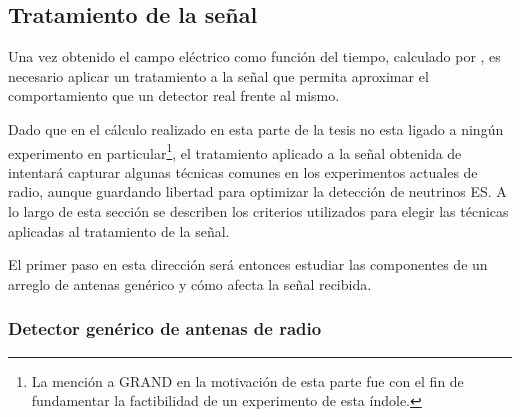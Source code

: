 	\subsection{Tratamiento de la se\~nal}
	\label{sbsc:sig_treat}
	
	Una vez obtenido el campo el\'ectrico como funci\'on del tiempo, calculado por \zhs{}, es necesario aplicar un tratamiento a la se\~nal que permita aproximar el comportamiento que un detector real frente al mismo.
	
	Dado que en el c\'alculo realizado en esta parte de la tesis no esta ligado a ning\'un experimento en particular\footnote{La menci\'on a GRAND en la motivaci\'on de esta parte fue con el fin de fundamentar la factibilidad de un experimento de esta \'indole.}, el tratamiento aplicado a la se\~nal obtenida de \zhs{} intentar\'a capturar algunas t\'ecnicas comunes en los experimentos actuales de radio, aunque guardando libertad para optimizar la detecci\'on de neutrinos ES.
	A lo largo de esta secci\'on se describen los criterios utilizados para elegir las t\'ecnicas aplicadas al tratamiento de la se\~nal.
	
	El primer paso en esta direcci\'on ser\'a entonces estudiar las componentes de un arreglo de antenas gen\'erico y c\'omo afecta la se\~nal recibida.
	
	\subsubsection{Detector gen\'erico de antenas de radio}
	
